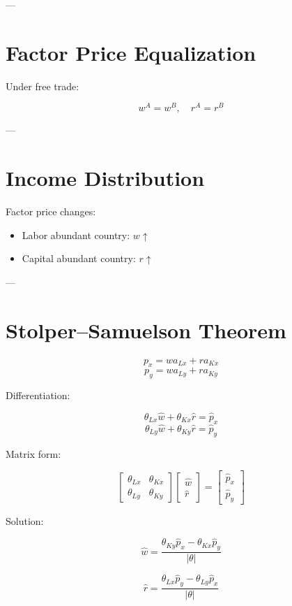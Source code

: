 ---

\section{Factor Price Equalization}

Under free trade:

\[
w^A = w^B, \quad r^A = r^B
\]

---

\section{Income Distribution}

Factor price changes:

\begin{itemize}
    \item Labor abundant country: $w \uparrow$
    \item Capital abundant country: $r \uparrow$
\end{itemize}

---

\section{Stolper--Samuelson Theorem}

\[
p_x = w a_{Lx} + r a_{Kx}
\]
\[
p_y = w a_{Ly} + r a_{Ky}
\]

Differentiation:

\[
\theta_{Lx} \hat{w} + \theta_{Kx} \hat{r} = \hat{p}_x
\]
\[
\theta_{Ly} \hat{w} + \theta_{Ky} \hat{r} = \hat{p}_y
\]

Matrix form:

\[
\begin{bmatrix}
\theta_{Lx} & \theta_{Kx} \\
\theta_{Ly} & \theta_{Ky}
\end{bmatrix}
\begin{bmatrix}
\hat{w} \\
\hat{r}
\end{bmatrix}
=
\begin{bmatrix}
\hat{p}_x \\
\hat{p}_y
\end{bmatrix}
\]

Solution:

\[
\hat{w} = \frac{\theta_{Ky} \hat{p}_x - \theta_{Kx} \hat{p}_y}{|\theta|}
\]

\[
\hat{r} = \frac{\theta_{Lx} \hat{p}_y - \theta_{Ly} \hat{p}_x}{|\theta|}
\]

